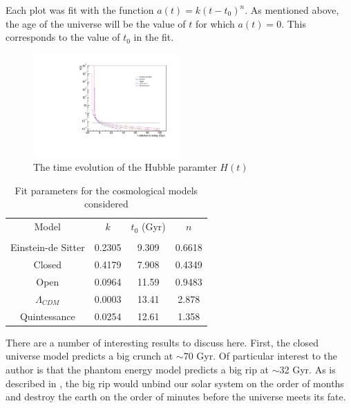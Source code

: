 \documentclass[aps,reprint,prl,floatfix]{revtex4-1}
\begin{document}
Each plot was fit with the function $a(t)=k(t-t_0)^n$.  As mentioned above, the age of the universe will be the value of $t$ for which $a(t) = 0$.  This corresponds to the value of $t_0$ in the fit.\\

\begin{figure}[H]
\includegraphics[width=0.5\textwidth]{ps1_plots/h1-5}
\caption{The time evolution of the Hubble paramter $H(t)$}
\end{figure}
\newpage
\begin{table}[h]
\begin{tabular}{c|c|c|c}
Model                 & $k$                   & $t_0$ (Gyr)           & $n$                  \\
\multicolumn{1}{l|}{} & \multicolumn{1}{l|}{} & \multicolumn{1}{l|}{} & \multicolumn{1}{l}{} \\ \hline
Einstein-de Sitter    & 0.2305                & 9.309                 & 0.6618               \\ \hline
Closed                & 0.4179                & 7.908                 & 0.4349               \\ \hline
Open                  & 0.0964                & 11.59                 & 0.9483               \\ \hline
$\Lambda_{CDM}$       & 0.0003                & 13.41                 & 2.878                \\ \hline
Quintessance          & 0.0254                & 12.61                 & 1.358               
\end{tabular}
\caption{Fit parameters for the cosmological models considered}
\end{table}
There are a number of interesting results to discuss here.  First, the closed universe model predicts a big crunch at $\sim$70 Gyr.  Of particular interest to the author is that the phantom energy model predicts a big rip at $\sim$32 Gyr.  As is described in \cite{Caldwell:2003vq}, the big rip would unbind our solar system on the order of months and destroy the earth on the order of minutes before the universe meets its fate.
\end{document}
